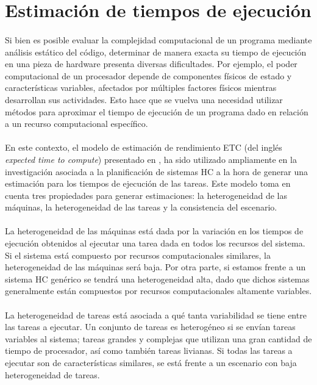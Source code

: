\section{Estimación de tiempos de ejecución} \label{section:descripcion-problema,subsection:estimacion-tiempo-ejecucion}

\paragraph{}Si bien es posible evaluar la complejidad computacional de un programa mediante análisis estático del código, determinar de manera exacta su tiempo de ejecución en una pieza de hardware presenta diversas dificultades.
Por ejemplo, el poder computacional de un procesador depende de componentes físicos de estado y características variables, afectados por múltiples factores físicos mientras desarrollan sus actividades.
Esto hace que se vuelva una necesidad utilizar métodos para aproximar el tiempo de ejecución de un programa dado en relación a un recurso computacional específico.

\paragraph{}En este contexto, el modelo de estimación de rendimiento ETC (del inglés \textit{expected time to compute}) presentado en \citet{bib-ali-hc-etc}, ha sido utilizado ampliamente en la investigación asociada a la planificación de sistemas HC a la hora de generar una estimación para los tiempos de ejecución de las tareas.
Este modelo toma en cuenta tres propiedades para generar estimaciones: la heterogeneidad de las máquinas, la heterogeneidad de las tareas y la consistencia del escenario.

\paragraph{}La heterogeneidad de las máquinas está dada por la variación en los tiempos de ejecución obtenidos al ejecutar una tarea dada en todos los recursos del sistema.
Si el sistema está compuesto por recursos computacionales similares, la heterogeneidad de las máquinas será baja.
Por otra parte, si estamos frente a un sistema HC genérico se tendrá una heterogeneidad alta, dado que dichos sistemas generalmente están compuestos por recursos computacionales altamente variables.

\paragraph{}La heterogeneidad de tareas está asociada a qué tanta variabilidad se tiene entre las tareas a ejecutar.
Un conjunto de tareas es heterogéneo si se envían tareas variables al sistema; tareas grandes y complejas que utilizan una gran cantidad de tiempo de procesador, así como también tareas livianas.
Si todas las tareas a ejecutar son de características similares, se está frente a un escenario con baja heterogeneidad de tareas.

